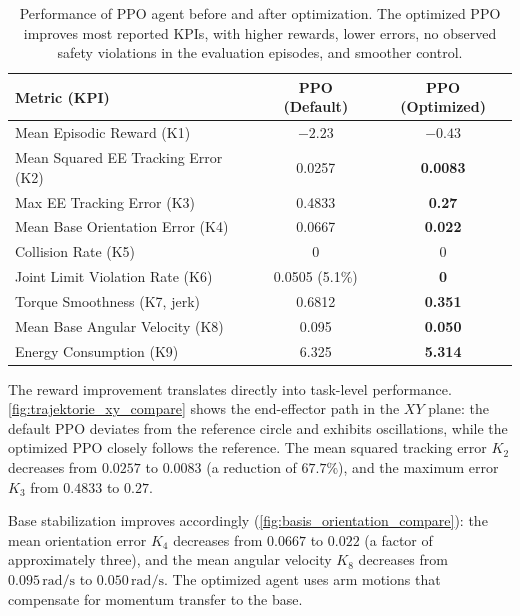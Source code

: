 \documentclass{ieeeaccess}
\begin{document}
\begin{table}[!b]
	\centering
	\caption{Performance of PPO agent before and after optimization. The optimized PPO improves most reported
		KPIs, with higher rewards, lower errors, no observed safety violations in the evaluation episodes,
		and smoother
		control.}
    \label{tab:ppo_optimization_kpi}
	\renewcommand{\arraystretch}{1.2}
	\setlength{\tabcolsep}{3pt}
	\begin{tabular}{lcc}
		\toprule
		\textbf{Metric (KPI)} & \textbf{PPO (Default)} & \textbf{PPO (Optimized)} \\
		\midrule
		Mean Episodic Reward (K1)        & $-2.23$  & $\mathbf{-0.43}$ \\
		Mean Squared EE Tracking Error (K2)      & 0.0257  & \textbf{0.0083} \\
		Max EE Tracking Error (K3)       & 0.4833   & \textbf{0.27} \\
		Mean Base Orientation Error (K4) & 0.0667  & \textbf{0.022} \\
		Collision Rate (K5)             & 0 & 0 \\
		Joint Limit Violation Rate (K6) & 0.0505 (5.1\%) & \textbf{0} \\
		Torque Smoothness (K7, jerk)     & 0.6812  & \textbf{0.351} \\
		Mean Base Angular Velocity (K8)  & 0.095  & \textbf{0.050} \\
		Energy Consumption (K9)          & 6.325  & \textbf{5.314} \\
		\bottomrule
	\end{tabular}
\end{table}

The reward improvement translates directly into task-level performance. \autoref{fig:trajektorie_xy_compare}
shows the end-effector path in the $XY$ plane: the default PPO deviates from the
reference circle and exhibits oscillations, while the optimized PPO closely follows the reference. The
mean squared tracking error $K_2$ decreases from $0.0257$ to $0.0083$ (a reduction of $67.7\%$),
and the maximum error $K_3$ from $0.4833$ to $0.27$.

Base stabilization improves accordingly (\autoref{fig:basis_orientation_compare}): the mean orientation error $K_4$ decreases from $0.0667$ to
$0.022$ (a factor of approximately three), and the mean angular velocity $K_8$ decreases from
$0.095\,\mathrm{rad/s}$ to $0.050\,\mathrm{rad/s}$. The optimized agent uses arm motions that compensate for momentum transfer
to the base.
\end{document}
